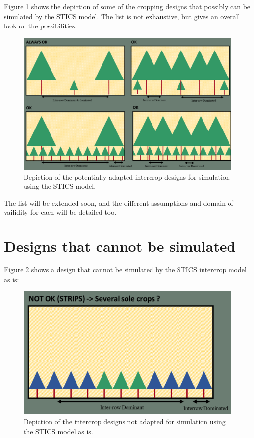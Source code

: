 \documentclass[]{book}
\begin{document}
Figure \ref{fig:DesignOK} shows the depiction of some of the cropping designs that possibly can be simulated by the STICS model. The list is not exhaustive, but gives an overall look on the possibilities:

\begin{figure}
\centering
\includegraphics{img/Design_OK.png}
\caption{\label{fig:DesignOK}Depiction of the potentially adapted intercrop designs for simulation using the STICS model.}
\end{figure}

The list will be extended soon, and the different assumptions and domain of vailidity for each will be detailed too.

\hypertarget{designs-that-cannot-be-simulated}{%
\section{Designs that cannot be simulated}\label{designs-that-cannot-be-simulated}}

Figure \ref{fig:DesignKO} shows a design that cannot be simulated by the STICS intercrop model as is:

\begin{figure}
\centering
\includegraphics{img/Design_KO.png}
\caption{\label{fig:DesignKO}Depiction of the intercrop designs not adapted for simulation using the STICS model as is.}
\end{figure}
\end{document}
